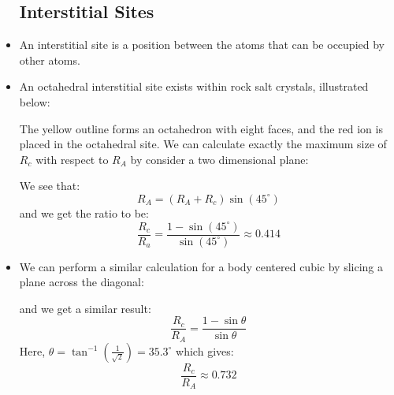 \begin{itemize}
    \subsection{Interstitial Sites}
    \item An interstitial site is a position between the atoms that can be occupied by other atoms.
    \item An octahedral interstitial site exists within rock salt crystals, illustrated below:
    \begin{center}
    \end{center}
    The yellow outline forms an octahedron with eight faces, and the red ion is placed in the octahedral site. We can calculate exactly the maximum size of $R_c$ with respect to $R_A$ by consider a two dimensional plane:
    \begin{center}
    \end{center}
    We see that:
    \begin{equation}
        R_A= (R_A+R_c)\sin(45^\circ)
    \end{equation}
    and we get the ratio to be:
    \begin{equation}
        \frac{R_c}{R_a} = \frac{1-\sin(45^\circ)}{\sin(45^\circ)} \approx 0.414
    \end{equation}
    \item We can perform a similar calculation for a body centered cubic by slicing a plane across the diagonal:
    \begin{center}
    \end{center}
    and we get a similar result:
    \begin{equation}
        \frac{R_c}{R_A} = \frac{1-\sin\theta}{\sin\theta}
    \end{equation}
    Here, $\theta =\tan^{-1}\left(\frac{1}{\sqrt{2}}\right)=35.3^\circ$ which gives:
    \begin{equation}
        \frac{R_c}{R_A} \approx 0.732
    \end{equation}

\end{itemize}

